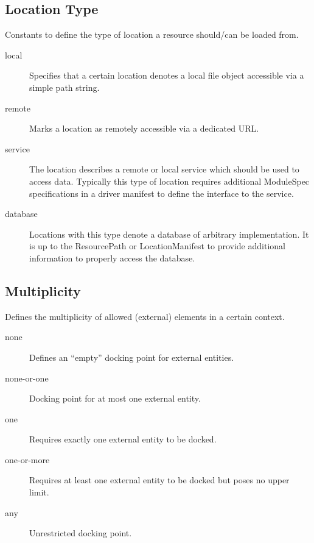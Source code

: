 \documentclass[11pt,a4paper]{report}
\begin{document}
\subsection{Location Type}
Constants to define the type of location a resource should/can be loaded from.
\label{sec:enum-location-type}
\begin{description}
	\item[local] Specifies that a certain location denotes a local file object accessible via a simple path string.
	\item[remote] Marks a location as remotely accessible via a dedicated URL.
	\item[service] The location describes a remote or local service which should be used to access data. Typically this type of location requires additional ModuleSpec specifications in a driver manifest to define the interface to the service.
	\item[database] Locations with this type denote a database of arbitrary implementation. It is up to the ResourcePath or LocationManifest to provide additional information to properly access the database.
\end{description}

\subsection{Multiplicity}
Defines the multiplicity of allowed (external) elements in a certain context.
\label{sec:enum-multiplicity}
\begin{description}
	\item[none] Defines an ``empty'' docking point for external entities.
	\item[none-or-one] Docking point for at most one external entity.
	\item[one] Requires exactly one external entity to be docked.
	\item[one-or-more] Requires at least one external entity to be docked but poses no upper limit.
	\item[any] Unrestricted docking point.
\end{description}
\end{document}
